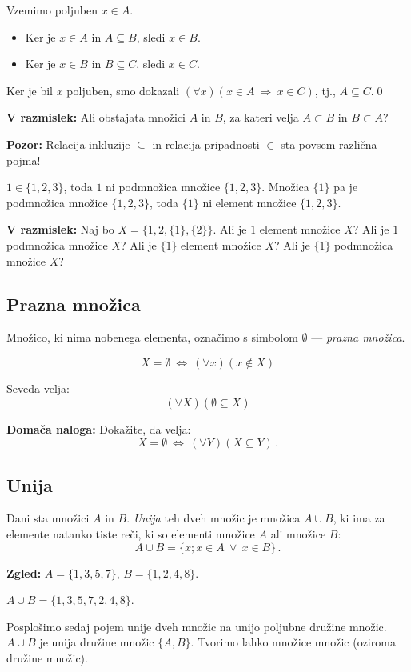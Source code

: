 \documentclass[11pt,paper=b5,DIV=13,headinclude,footinclude]{scrbook}
\def\ali {{~\vee~}}
\def\sledi {{~\Rightarrow~}}
\def\cee {{~\Leftrightarrow~}}
\begin{document}
Vzemimo poljuben $x\in A$.
\begin{itemize}
  \item Ker je $x\in A$ in $A\subseteq B$, sledi $x\in B$.
  \item Ker je $x\in B$ in $B\subseteq C$, sledi $x\in C$.
\end{itemize}
Ker je bil $x$ poljuben, smo dokazali $(\forall x)(x\in A\sledi x\in C)$, tj., $A\subseteq C$.\qed


\medskip
\noindent\textbf{ V razmislek:} Ali obstajata množici $A$ in $B$, za kateri velja $A\subset B$ in $B\subset A$?

\bigskip
\noindent\textbf{ Pozor:} Relacija inkluzije $\subseteq$ in relacija pripadnosti $\in$ sta povsem različna pojma!

$1\in\{1,2,3\}$, toda $1$ ni podmnožica množice $\{1,2,3\}$.
Množica $\{1\}$ pa je podmnožica množice $\{1,2,3\}$, toda
$\{1\}$ ni element množice $\{1,2,3\}$.

\bigskip
\noindent\textbf{ V razmislek:} Naj bo $X = \{1,2,\{1\},\{2\}\}$.
Ali je $1$ element množice $X$?
Ali je $1$ podmnožica množice $X$?
Ali je $\{1\}$ element množice $X$?
Ali je $\{1\}$ podmnožica množice $X$?

\bigskip
\subsection{Prazna množica}
Množico, ki nima nobenega elementa, označimo s simbolom $\emptyset$ --- {\em prazna množica}.

$$X = \emptyset \cee (\forall x)(x\not\in X)$$

Seveda velja:
$$(\forall X) (\emptyset \subseteq X)$$

\textbf{ Domača naloga:} Dokažite, da velja:
$$X = \emptyset\cee (\forall Y)(X\subseteq Y)\,.$$

\subsection{Unija}

Dani sta množici $A$ in $B$. {\em Unija} teh dveh množic je množica $A\cup B$, ki ima za elemente natanko tiste reči, ki so elementi množice $A$ ali množice $B$:
$$A\cup B = \{x; x\in A \ali x\in B\}\,.$$

\textbf{ Zgled:}
$A = \{1,3,5,7\}$, $B = \{1,2,4,8\}$.

$A\cup B = \{1,3,5,7,2,4,8\}$.

\medskip
Posplošimo sedaj pojem unije dveh množic na unijo poljubne družine množic.
$A\cup B$ je unija družine množic $\{A,B\}$.
Tvorimo lahko množice množic (oziroma družine množic).
\end{document}
